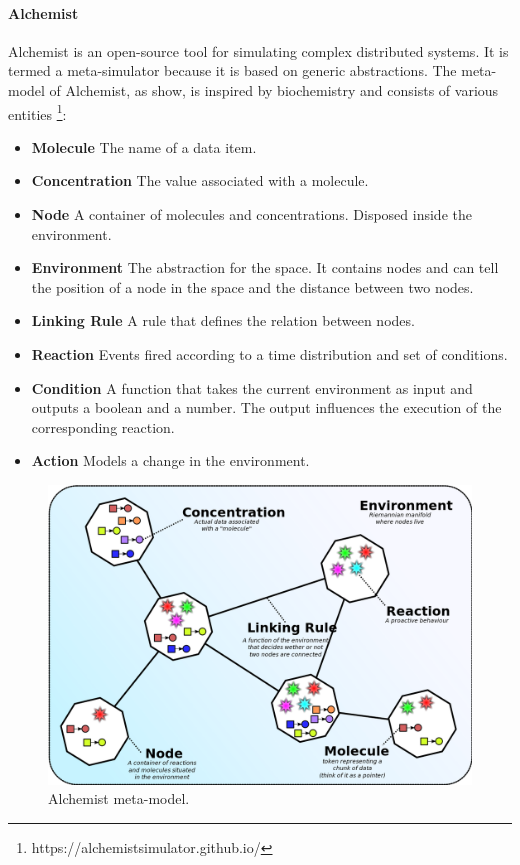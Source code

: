 \documentclass[12pt,a4paper,openright,twoside]{book}
\begin{document}
\paragraph*{Alchemist}

Alchemist \cite{Pianini_2013} is an open-source tool for simulating complex distributed systems. It is termed a meta-simulator because it is based on generic abstractions.
The meta-model of Alchemist, as  show, is inspired by biochemistry and consists of various entities \footnote{https://alchemistsimulator.github.io/}:
\begin{itemize}
  \item \textbf{Molecule} The name of a data item.
  \item \textbf{Concentration} The value associated with a molecule.
  \item \textbf{Node} A container of molecules and concentrations. Disposed inside the environment.
  \item \textbf{Environment} The abstraction for the space. It contains nodes and can tell the position of a node in the space and the distance between two nodes.
  \item \textbf{Linking Rule} A rule that defines the relation between nodes.
  \item \textbf{Reaction} Events fired according to a time distribution and set of conditions.
  \item \textbf{Condition} A function that takes the current environment as input and outputs a boolean and a number. The output influences the execution of the corresponding reaction.
  \item \textbf{Action} Models a change in the environment.
\end{itemize}

\begin{figure}[h!]
  \centering
  \includegraphics[width=\textwidth]{figures/alchemist-model.png}
  \caption{Alchemist meta-model.}
  \label{fig:alchemist-meta-model}
\end{figure}
\end{document}

